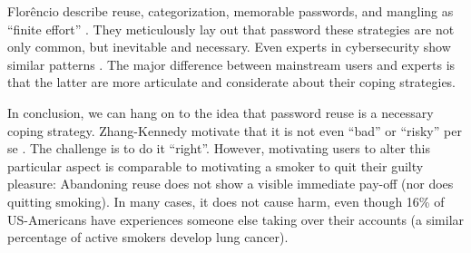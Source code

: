 	Florêncio \etal describe reuse, categorization, memorable passwords, and mangling as ``finite effort'' \cite{Florencio2014PasswordPortfoliosFiniteUser}. They meticulously lay out that password these strategies are not only common, but inevitable and necessary. Even experts in cybersecurity show similar patterns \cite{Loutfi2015PasswordsOtherSideOfTheFence,Stobert2015ExpertPassword}. The major difference between mainstream users and experts is that the latter are more articulate and considerate about their coping strategies. 

	
	In conclusion, we can hang on to the idea that password reuse is a necessary coping strategy. Zhang-Kennedy \etal motivate that it is not even ``bad'' or ``risky'' per se \cite{ZhangKennedy2016RevisitingPasswordRules}. The challenge is to do it ``right''. However, motivating users to alter this particular aspect is comparable to motivating a smoker to quit their guilty pleasure: Abandoning reuse does not show a visible immediate pay-off (nor does quitting smoking). In many cases, it does not cause harm, even though 16\% of US-Americans have experiences someone else taking over their accounts \cite{Olmstead2017AmerciansCybersecurity} (a similar percentage of active smokers develop lung cancer). 
	
	
